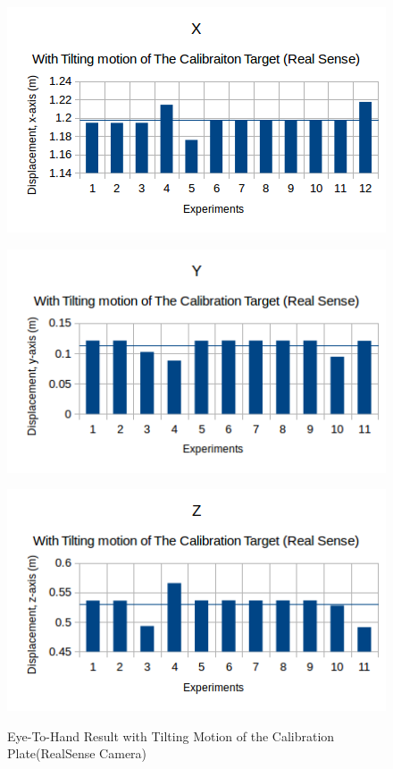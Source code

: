 \begin{figure}[htp]
\begin{center}
{
  \includegraphics[clip,width=0.5\columnwidth]{figures/tiltingorientation_real_x.png}%
}
\end{center}
\begin{center}
{
  \includegraphics[clip,width=0.5\columnwidth]{figures/tiltingorientation_real_y.png}%
}
\end{center}

\begin{center}
{
  \includegraphics[clip,width=0.5\columnwidth]{figures/tiltingorientation_real_z.png}%
}
\end{center}
\caption{Eye-To-Hand Result with Tilting Motion of the Calibration Plate(RealSense Camera)}
\end{figure}
